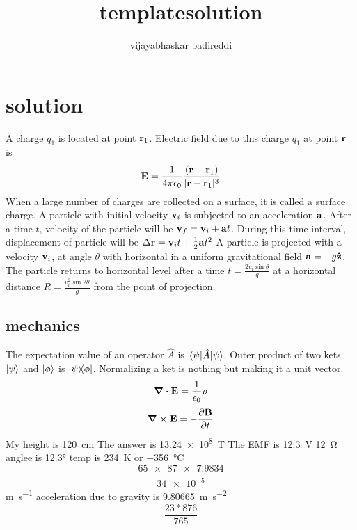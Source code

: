 \documentclass[12pt] {article}
\title{templatesolution}
\author{vijayabhaskar badireddi}
\begin{document}
        
\section*{solution}
A charge $q_1$ is located at point $\vb{r}_1$.
Electric field due to this charge $q_1$ at point $\vb{r}$ is
\[\vb{E}=\frac{1}{4\pi\epsilon_0}\frac{(\vb{r}-\vb{r}_1)}{|\vb{r}-\vb{r}_1|^3}\]
When a large number of charges are collected on a surface, it is called a surface charge.
A particle with initial velocity $\vb{v}_i$ is subjected to an acceleration $\vb{a}$.
After a time $t$, velocity of the particle will be $\vb{v}_f=\vb{v}_i+\vb{a}t$.
During this time interval, displacement of particle will be $\Delta{\vb{r}}=\vb{v}_it+\frac{1}{2}\vb{a}t^2$
A particle is projected with a velocity $\vb{v}_i$, at angle $\theta$ with
 horizontal in a uniform gravitational field $\vb{a}=-g\vu{z}$. The particle returns to 
 horizontal level after a time $t=\frac{2v_i\sin\theta}{g}$ at a horizontal distance
  $R=\frac{v_i^2\sin2\theta}{g}$ from the point of projection.
\subsection*{mechanics}
The expectation value of an operator $\hat{A}$ is $\expval{\hat{A}}{\psi}$. Outer product 
of two kets $\ket{\psi}$ and $\ket{\phi}$ is $\op{\psi}{\phi}$.
Normalizing a ket is nothing but making it a unit vector.
\[\div{\vb{E}}=\frac{1}{\epsilon_0}\rho\]
\[\curl{\vb{E}}=-\pdv{\vb{B}}{t}\]
My height is \SI{120}{\centi\metre}
The answer is \SI{13.24e8}{\tesla}
The EMF is \SI{12.3}{\volt}
\SI{12}{\ohm}\\
anglee is \ang{12.3}
temp is \SI{234}{\kelvin} or \SI{-356}{\celsius}
\[\frac{\num{65 x 87 x 7.9834}}{\num{34e-5}}\]
\si{\meter\per\second}
acceleration due to gravity is \SI{9.80665}{\meter\per\square\second}
\[\frac{23*876}{765}\]
\end{document}
